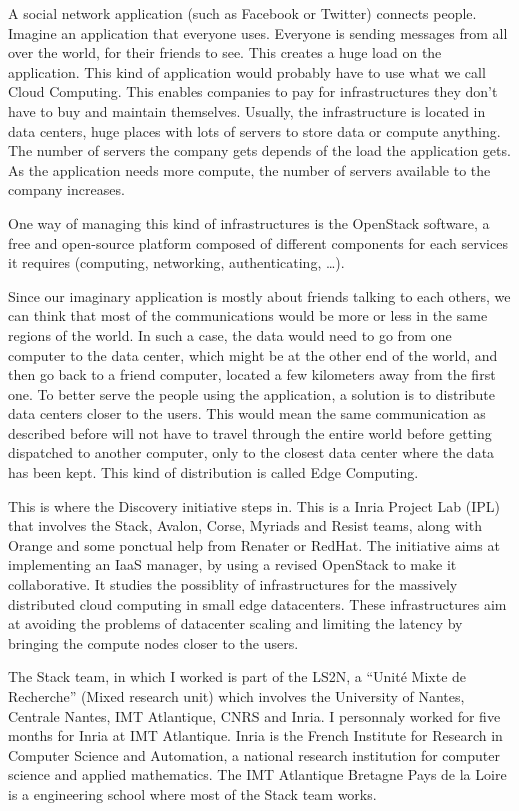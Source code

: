 A social network application (such as Facebook or Twitter) connects people. Imagine an application that everyone uses. Everyone is sending messages from all over the world, for their friends to see. This creates a huge load on the application. This kind of application would probably have to use what we call Cloud Computing. This enables companies to pay for infrastructures they don't have to buy and maintain themselves. Usually, the infrastructure is located in data centers, huge places with lots of servers to store data or compute anything. The number of servers the company gets depends of the load the application gets. As the application needs more compute, the number of servers available to the company increases.

One way of managing this kind of infrastructures is the OpenStack software, a free and open-source platform composed of different components for each services it requires (computing, networking, authenticating, \ldots).

Since our imaginary application is mostly about friends talking to each others, we can think that most of the communications would be more or less in the same regions of the world. In such a case, the data would need to go from one computer to the data center, which might be at the other end of the world, and then go back to a friend computer, located a few kilometers away from the first one. To better serve the people using the application, a solution is to distribute data centers closer to the users. This would mean the same communication as described before will not have to travel through the entire world before getting dispatched to another computer, only to the closest data center where the data has been kept. This kind of distribution is called Edge Computing.


This is where the Discovery initiative\cite{discovery} steps in. This is a Inria Project Lab (IPL) that involves the Stack, Avalon, Corse, Myriads and Resist teams, along with Orange and some ponctual help from Renater or RedHat. The initiative aims at implementing an IaaS manager, by using a revised OpenStack to make it collaborative. It studies the possiblity of infrastructures for the massively distributed cloud computing in small edge datacenters. These infrastructures aim at avoiding the problems of datacenter scaling and limiting the latency by bringing the compute nodes closer to the users.

The Stack team, in which I worked is part of the LS2N, a ``Unité Mixte de Recherche'' (Mixed research unit) which involves the University of Nantes, Centrale Nantes, IMT Atlantique, CNRS and Inria. I personnaly worked for five months for Inria at IMT Atlantique. Inria is the French Institute for Research in Computer Science and Automation, a national research institution for computer science and applied mathematics. The IMT Atlantique Bretagne Pays de la Loire is a engineering school where most of the Stack team works.

